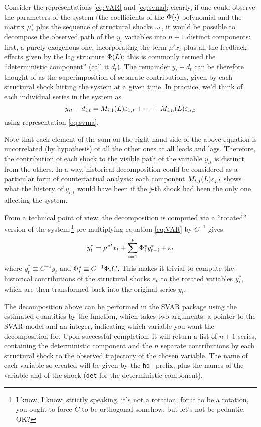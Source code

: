 \documentclass[a4paper,10pt]{article}
\newcommand{\dtk}[1]{\texttt{\detokenize{#1}}}
\newcommand{\StS}[1]{\ensuremath \varepsilon_{#1}} %
\newcommand{\VarSym}{\ensuremath \Phi}
\begin{document}
Consider the representations \eqref{eq:VAR} and \eqref{eq:svma};
clearly, if one could observe the parameters of the system (the
coefficients of the $\VarSym(\cdot)$ polynomial and the matrix $\mu$) plus
the sequence of structural shocks $\StS{t}$, it would be possible to
decompose the observed path of the $y_t$ variables into $n + 1$
distinct components: first, a purely exogenous one, incorporating the
term $\mu' x_t$ plus all the feedback effects given by the lag
structure $\VarSym(L)$; this is commonly termed the ``deterministic
component'' (call it $d_t$). The remainder $y_t - d_t$ can be
therefore thought of as the superimposition of separate contributions,
given by each structural shock hitting the system at a given time. In
practice, we'd think of each individual series in the system as
\[
 y_{it} - d_{i,t} = M_{i,1}(L) \StS{1,t} + \cdots + M_{i,n}(L) \StS{n,t} 
\]
using representation \eqref{eq:svma}. 

Note that each element of the sum on the right-hand side of the above
equation is uncorrelated (by hypothesis) of all the other ones at all
leads and lags. Therefore, the contribution of each shock to the
visible path of the variable $y_{it}$ is distinct from the others. In
a way, historical decomposition could be considered as a particular
form of counterfactual analysis: each component $M_{i,j}(L) \StS{j,t}$
shows what the history of $y_{i,t}$ would have been if the $j$-th
shock had been the only one affecting the system.

From a technical point of view, the decomposition is computed via a
``rotated'' version of the system:\footnote{I know, I know: strictly
  speaking, it's not a rotation; for it to be a rotation, you ought to
  force $C$ to be orthogonal somehow; but let's not be pedantic, OK?}
pre-multiplying equation \eqref{eq:VAR} by $C^{-1}$ gives
\[
  y^*_t = {\mu^*}' x_t +  \sum_{i=1}^p \VarSym^*_i y^*_{t-i} + \StS{t}
\]
where $y^*_t \equiv C^{-1} y_t$ and $\VarSym^*_i \equiv C^{-1}
\VarSym_i C$. This makes it trivial to compute the historical
contributions of the structural shocks $\StS{t}$ to the rotated
variables $y^*_t$, which are then transformed back into the original
series $y_t$.

The decomposition above can be performed in the SVAR package using the
estimated quantities by the \dtk{SVAR_hd} function, which takes two
arguments: a pointer to the SVAR model and an integer, indicating
which variable you want the decomposition for. Upon successful
completion, it will return a list of $n+1$ series, containing the
deterministic component and the $n$ separate contributions by each
structural shock to the observed trajectory of the chosen
variable. The name of each variable so created will be given by the
\verb|hd_| prefix, plus the names of the variable and of the shock
(\verb|det| for the deterministic component).
\end{document}
